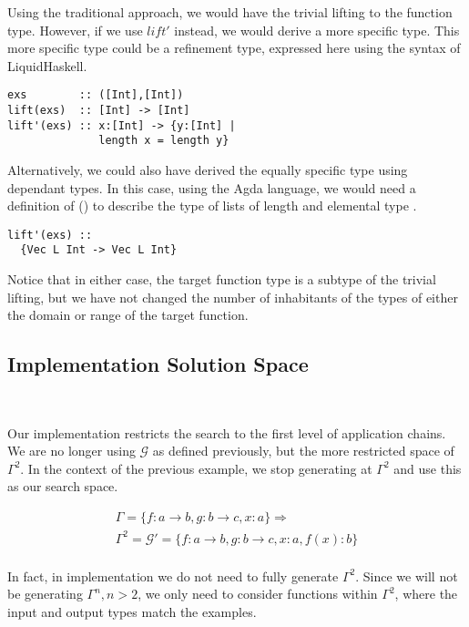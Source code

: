 Using the traditional approach, we would have the trivial lifting to the function type.
However, if we use $lift'$ instead, we would derive a more specific type.
This more specific type could be a refinement type, expressed here using the syntax of LiquidHaskell\cite{DBLP:conf/icfp/VazouSJVJ14}.
 
\begin{lstlisting}
exs        :: ([Int],[Int])
lift(exs)  :: [Int] -> [Int] 
lift'(exs) :: x:[Int] -> {y:[Int] |
              length x = length y}
\end{lstlisting}

Alternatively, we could also have derived the equally specific type using dependant types\cite{dependant_types}.
In this case, using the Agda language, we would need a definition of () to describe the type of lists of length  and elemental type .

\begin{lstlisting}
lift'(exs) ::
  {Vec L Int -> Vec L Int}
\end{lstlisting}

Notice that in either case, the target function type is a subtype of the trivial lifting, but we have not changed the number of inhabitants of the types of either the domain or range of the target function.

\subsection{Implementation Solution Space}\label{solnSpace}\

Our implementation restricts the search to the first level of application chains.
We are no longer using $\mathcal{G}$ as defined previously, but the more restricted space of $\Gamma^2$.
In the context of the previous example, we stop generating at $\Gamma^2$ and use this as our search space.

\begin{gather*}
\Gamma = \{f:a\to b, g:b\to c, x:a\} \Rightarrow \\
\Gamma^2 = \mathcal{G}' = \{f:a\to b, g:b\to c, x:a, f(x):b\}\\
\end{gather*}

In fact, in implementation we do not need to fully generate $\Gamma^2$.
Since we will not be generating $\Gamma^n, n>2$, we only need to consider functions within $\Gamma^2$, where the input and output types match the examples.

